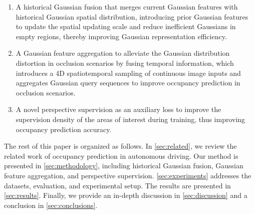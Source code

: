 \documentclass[journal]{IEEEtran}
\begin{document}
\begin{enumerate} [noitemsep,leftmargin=*,topsep=0pt]
    \item A historical Gaussian fusion that merges current Gaussian features with historical Gaussian spatial distribution, introducing prior Gaussian features to update the spatial updating scale and reduce inefficient Gaussians in empty regions, thereby improving Gaussian representation efficiency. 
    \item A Gaussian feature aggregation to alleviate the Gaussian distribution distortion in occlusion scenarios by fusing temporal information, which introduces a 4D spatiotemporal sampling of continuous image inputs and aggregates Gaussian query sequences to improve occupancy prediction in occlusion scenarios.
    \item A novel perspective supervision as an auxiliary loss to improve the supervision density of the areas of interest during training, thus improving occupancy prediction accuracy.
\end{enumerate}


The rest of this paper is organized as follows. 
In \autoref{sec:related}, we review the related work of occupancy prediction in autonomous driving. 
Our method is presented in \autoref{sec:methodology}, including historical Gaussian fusion, Gaussian feature aggregation, and perspective supervision. 
\autoref{sec:experiments} addresses the datasets, evaluation, and experimental setup. 
The results are presented in \autoref{sec:results}. 
Finally, we provide an in-depth discussion in \autoref{sec:discussion} and a conclusion in \autoref{sec:conclusions}.
\end{document}
